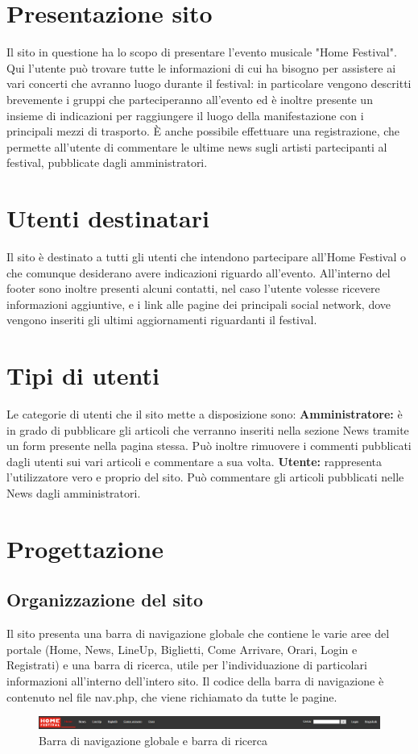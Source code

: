 \documentclass[10pt, a4paper]{article}
\begin{document}
\newpage
\hypersetup{hidelinks}
\tableofcontents
\newpage
\section{Presentazione sito}
Il sito in questione ha lo scopo di presentare l'evento musicale "Home Festival". Qui l'utente può trovare tutte le informazioni di cui ha bisogno per assistere ai vari concerti che avranno luogo durante il festival: in particolare vengono descritti brevemente i gruppi che parteciperanno all'evento ed è inoltre presente un insieme di indicazioni per raggiungere il luogo della manifestazione con i principali mezzi di trasporto.
È anche possibile effettuare una registrazione, che permette all'utente di commentare le ultime news sugli artisti partecipanti al festival, pubblicate dagli amministratori. 
\section{Utenti destinatari}
Il sito è destinato a tutti gli utenti che intendono partecipare all’Home Festival o che comunque desiderano avere indicazioni riguardo all’evento.  
All’interno del footer sono inoltre presenti alcuni contatti, nel caso l’utente volesse ricevere informazioni aggiuntive, e i link alle pagine dei principali social network, dove vengono inseriti gli ultimi aggiornamenti riguardanti il festival.
\section{Tipi di utenti}
Le categorie di utenti che il sito mette a disposizione sono:
\newline \textbf{Amministratore: }è in grado di pubblicare gli articoli che verranno inseriti nella sezione News tramite un form presente nella pagina stessa. Può inoltre rimuovere i commenti pubblicati dagli utenti sui vari articoli e commentare a sua volta.
\newline \textbf{Utente: }rappresenta l'utilizzatore vero e proprio del sito. Può commentare gli articoli pubblicati nelle News dagli amministratori.
\section{Progettazione}
\subsection{Organizzazione del sito}
Il sito presenta una barra di navigazione globale che contiene le varie aree del portale (Home, News, LineUp, Biglietti, Come Arrivare, Orari, Login e Registrati) e una barra di ricerca, utile per l'individuazione di particolari informazioni all'interno dell'intero sito.
Il codice della barra di navigazione è contenuto nel file nav.php, che viene richiamato da tutte le pagine.
\begin{figure}[h!]
  \centering
  \includegraphics[width=1\textwidth]{Images/navbar.png}
  \caption{Barra di navigazione globale e barra di ricerca}
  \label{fig:navbar}
\end{figure}
\newpage
\end{document}
